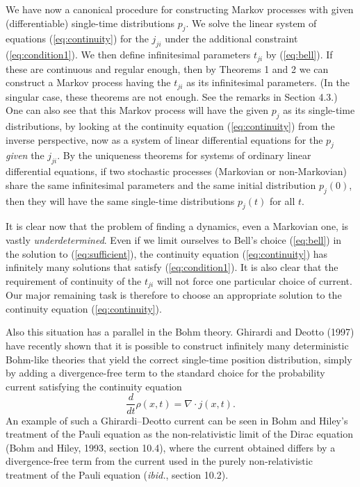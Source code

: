 \documentclass[12pt]{article}
\newcommand{\be}{\begin{equation}}
\newcommand{\ee}{\end{equation}}
\begin{document}
We have now a canonical procedure for constructing Markov processes 
with given (differentiable) single-time distributions $p_j$.  We solve 
the linear system of equations (\ref{eq:continuity}) for the $j_{ji}$ 
under the additional constraint (\ref{eq:condition1}).  We then define 
infinitesimal parameters $t_{ji}$ by (\ref{eq:bell}).  If these are 
continuous and regular enough, then by Theorems 1 and 2 we can 
construct a Markov process having the $t_{ji}$ as its infinitesimal 
parameters.  (In the singular case, these theorems are not enough.  
See the remarks in Section 4.3.) One can also see that this Markov 
process will have the given $p_j$ as its single-time distributions, by 
looking at the continuity equation (\ref{eq:continuity}) from the 
inverse perspective, now as a system of linear differential equations 
for the $p_j$ {\em given} the $j_{ji}$.  By the uniqueness theorems 
for systems of ordinary linear differential equations, if two 
stochastic processes (Markovian or non-Markovian) share the same 
infinitesimal parameters and the same initial distribution $p_j(0)$, 
then they will have the same single-time distributions $p_j(t)$ for 
all $t$.

It is clear now that the problem of finding a dynamics, even a 
Markovian one, is vastly {\em underdetermined}.  Even if we limit 
ourselves to Bell's choice (\ref{eq:bell}) in the solution to 
(\ref{eq:sufficient}), the continuity equation (\ref{eq:continuity}) 
has infinitely many solutions that satisfy (\ref{eq:condition1}).  It 
is also clear that the requirement of continuity of the $t_{ji}$ will 
not force one particular choice of current.  Our major remaining task 
is therefore to choose an appropriate solution to the continuity 
equation (\ref{eq:continuity}).

Also this situation has a parallel in the Bohm theory.  Ghirardi and 
Deotto (1997) have recently shown that it is possible to construct 
infinitely many deterministic Bohm-like theories that yield the 
correct single-time position distribution, simply by adding a 
divergence-free term to the standard choice for the probability 
current satisfying the continuity equation
\be
  \frac{d}{dt}\rho(x,t)=\nabla\cdot j(x,t).
\ee
An example of such a Ghirardi--Deotto current can be seen in Bohm and 
Hiley's treatment of the Pauli equation as the non-relativistic limit 
of the Dirac equation (Bohm and Hiley, 1993, section 10.4), where the 
current obtained differs by a divergence-free term from the current 
used in the purely non-relativistic treatment of the Pauli equation 
({\em ibid.}, section 10.2).
\end{document}

